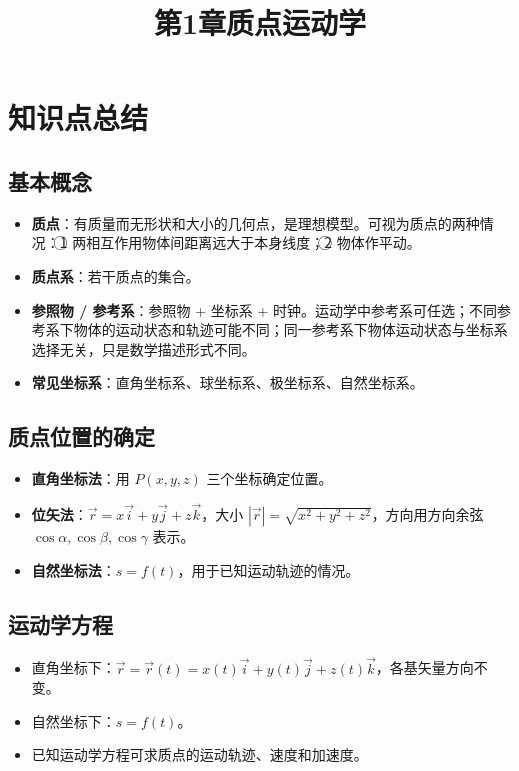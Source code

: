 \documentclass[12pt,a4paper]{ctexart}
\title{第1章\quad 质点运动学}
\author{}
\date{}
\begin{document}
\maketitle

\section{知识点总结}

\subsection{基本概念}

\begin{itemize}
    \item \textbf{质点}：有质量而无形状和大小的几何点，是理想模型。可视为质点的两种情况：\textcircled{1} 两相互作用物体间距离远大于本身线度；\textcircled{2} 物体作平动。
    \item \textbf{质点系}：若干质点的集合。
    \item \textbf{参照物 / 参考系}：参照物 + 坐标系 + 时钟。运动学中参考系可任选；不同参考系下物体的运动状态和轨迹可能不同；同一参考系下物体运动状态与坐标系选择无关，只是数学描述形式不同。
    \item \textbf{常见坐标系}：直角坐标系、球坐标系、极坐标系、自然坐标系。
\end{itemize}

\subsection{质点位置的确定}

\begin{itemize}
    \item \textbf{直角坐标法}：用 $P(x, y, z)$ 三个坐标确定位置。
    \item \textbf{位矢法}：$\vec{r} = x\vec{i} + y\vec{j} + z\vec{k}$，大小 $|\vec{r}| = \sqrt{x^2 + y^2 + z^2}$，方向用方向余弦 $\cos\alpha, \cos\beta, \cos\gamma$ 表示。
    \item \textbf{自然坐标法}：$s = f(t)$，用于已知运动轨迹的情况。
\end{itemize}

\subsection{运动学方程}

\begin{itemize}
    \item 直角坐标下：$\vec{r} = \vec{r}(t) = x(t)\vec{i} + y(t)\vec{j} + z(t)\vec{k}$，各基矢量方向不变。
    \item 自然坐标下：$s = f(t)$。
    \item 已知运动学方程可求质点的运动轨迹、速度和加速度。
\end{itemize}
\end{document}
